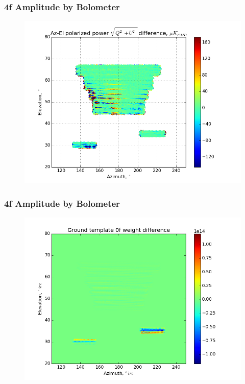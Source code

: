 \documentclass{beamer}
\begin{document}
\begin{frame}
\frametitle{4f Amplitude by Bolometer}
\begin{figure}
\includegraphics[width=0.9\linewidth]{dMag_gt_AMP_4F_BY_BOLO.png}
\end{figure}
\end{frame}

\begin{frame}
\frametitle{4f Amplitude by Bolometer}
\begin{figure}
\includegraphics[width=0.9\linewidth]{dw0_gt_AMP_4F_BY_BOLO.png}
\end{figure}
\end{frame}
\end{document}

